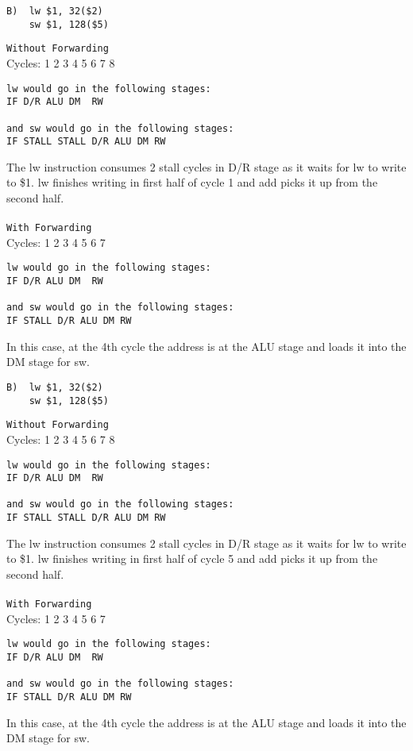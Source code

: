 \documentclass[11pt]{article}
\begin{document}
\begin{verbatim}
B)  lw $1, 32($2) 
    sw $1, 128($5)
\end{verbatim}
\texttt{Without Forwarding}
\\Cycles: 1   2   3   4   5   6   7   8

\begin{verbatim}
lw would go in the following stages:
IF D/R ALU DM  RW
    
and sw would go in the following stages:
IF STALL STALL D/R ALU DM RW
\end{verbatim}
The lw instruction consumes 2 stall cycles in D/R stage as it waits for lw to write to \$1.  lw finishes writing in first half of cycle 1 and add picks it up from the second half.\\ \\
\texttt{With Forwarding}
\\Cycles: 1   2   3   4   5   6   7

\begin{verbatim}
lw would go in the following stages:
IF D/R ALU DM  RW

and sw would go in the following stages:
IF STALL D/R ALU DM RW
\end{verbatim}
In this case, at the 4th cycle the address is at the ALU stage and loads it into the DM stage for sw.


\begin{verbatim}
B)  lw $1, 32($2) 
    sw $1, 128($5)
\end{verbatim}
\texttt{Without Forwarding}
\\Cycles: 1   2   3   4   5   6   7   8

\begin{verbatim}
lw would go in the following stages:
IF D/R ALU DM  RW
    
and sw would go in the following stages:
IF STALL STALL D/R ALU DM RW
\end{verbatim}
The lw instruction consumes 2 stall cycles in D/R stage as it waits for lw to write to \$1.  lw finishes writing in first half of cycle 5 and add picks it up from the second half.\\ \\
\texttt{With Forwarding}
\\Cycles: 1   2   3   4   5   6   7

\begin{verbatim}
lw would go in the following stages:
IF D/R ALU DM  RW

and sw would go in the following stages:
IF STALL D/R ALU DM RW
\end{verbatim}
In this case, at the 4th cycle the address is at the ALU stage and loads it into the DM stage for sw.
\end{document}
